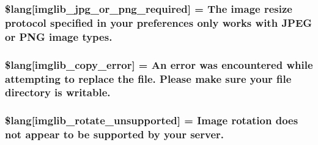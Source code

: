 \subsubsection[{\$lang}]{\setlength{\rightskip}{0pt plus 5cm}\$lang\mbox{[}\textquotesingle{}imglib\+\_\+jpg\+\_\+or\+\_\+png\+\_\+required\textquotesingle{}\mbox{]} = \textquotesingle{}The image resize protocol specified in your preferences only works with J\+P\+E\+G or P\+N\+G image types.\textquotesingle{}}\label{_admin_2system_2language_2english_2imglib__lang_8php_a2878e2b878871cd8010970f865d70e71}
\hypertarget{_admin_2system_2language_2english_2imglib__lang_8php_a012b6a0d2b3a8ef934e8783d2fbd6535}{}
\subsubsection[{\$lang}]{\setlength{\rightskip}{0pt plus 5cm}\$lang\mbox{[}\textquotesingle{}imglib\+\_\+copy\+\_\+error\textquotesingle{}\mbox{]} = \textquotesingle{}An error was encountered while attempting to replace the file. Please make sure your file directory is writable.\textquotesingle{}}\label{_admin_2system_2language_2english_2imglib__lang_8php_a012b6a0d2b3a8ef934e8783d2fbd6535}
\hypertarget{_admin_2system_2language_2english_2imglib__lang_8php_ab1c77c6b58fc5bf8e979ab4237ec87e7}{}
\subsubsection[{\$lang}]{\setlength{\rightskip}{0pt plus 5cm}\$lang\mbox{[}\textquotesingle{}imglib\+\_\+rotate\+\_\+unsupported\textquotesingle{}\mbox{]} = \textquotesingle{}Image rotation does not appear to be supported by your server.\textquotesingle{}}\label{_admin_2system_2language_2english_2imglib__lang_8php_ab1c77c6b58fc5bf8e979ab4237ec87e7}
\hypertarget{_admin_2system_2language_2english_2imglib__lang_8php_a8f190c17a02ca89334c8bf0a04333f65}{}
